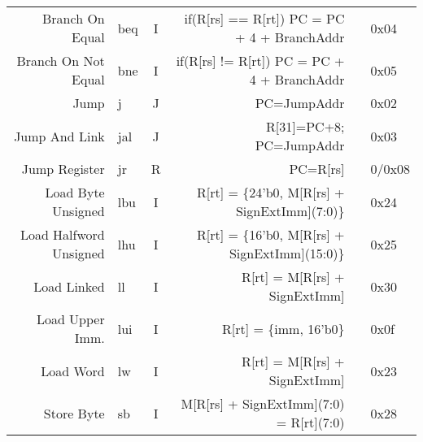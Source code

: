\begin{tabularx}{\textwidth}{NMcDcO}
    \midrule
    Branch On Equal                                     & beq                                      & I & if(R[rs] == R[rt]) PC = PC + 4 + BranchAddr             & \footnotemark[4]                 & 0x04   \\
    Branch On Not Equal                                 & bne                                      & I & if(R[rs] != R[rt]) PC = PC + 4 + BranchAddr             & \footnotemark[4]                 & 0x05   \\
    Jump                                                & j                                        & J & PC=JumpAddr                                             & \footnotemark[5]                 & 0x02   \\
    Jump And Link                                       & jal                                      & J & R[31]=PC+8; PC=JumpAddr                                 & \footnotemark[5]\footnotemark[7] & 0x03   \\
    Jump Register                                       & jr                                       & R & PC=R[rs]                                                &                                  & 0/0x08 \\
    \midrule
    Load Byte Unsigned                                  & lbu                                      & I & R[rt] = \{24'b0, M[R[rs] + SignExtImm](7:0)\}           & \footnotemark[2]                 & 0x24   \\
    Load Halfword Unsigned                              & lhu                                      & I & R[rt] = \{16'b0, M[R[rs] + SignExtImm](15:0)\}          & \footnotemark[2]                 & 0x25   \\
    Load Linked                                         & ll                                       & I & R[rt] = M[R[rs] + SignExtImm]                           & \footnotemark[2]\footnotemark[7] & 0x30   \\
    Load Upper Imm.                                     & lui                                      & I & R[rt] = \{imm, 16'b0\}                                  &                                  & 0x0f   \\
    Load Word                                           & lw                                       & I & R[rt] = M[R[rs] + SignExtImm]                           & \footnotemark[2]                 & 0x23   \\
    Store Byte                                          & sb                                       & I & M[R[rs] + SignExtImm](7:0) = R[rt](7:0)                 & \footnotemark[2]                 & 0x28   \\

\end{tabularx}
